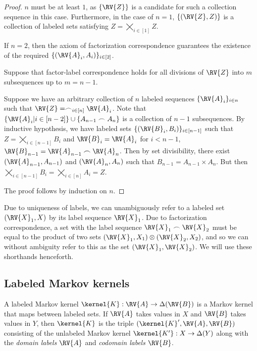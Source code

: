 \begin{proof}
$n$ must be at least $1$, as $\{\RV{Z}\}$ is a candidate for such a collection sequence in this case. Furthermore, in the case of $n=1$, $\{(\RV{Z},Z)\}$ is a collection of labeled sets satisfying $Z=\bigtimes_{i\in [1]} Z$.

If $n=2$, then the axiom of factorization correspondence guarantees the existence of the required $\{(\RV{A}_i,A_i)\}_{i\in [2]}$.

Suppose that factor-label correspondence holds for all divisions of $\RV{Z}$ into $m$ subsequences up to $m=n-1$.

Suppose we have an arbitrary collection of $n$ labeled sequences $\{\RV{A}_i\}_{i\in n}$ such that $\RV{Z}= \frown_{i\in [n]} \RV{A}_i$. Note that $\{\RV{A}_i|{i\in[n-2]}\}\cup\{A_{n-1}\frown A_n\}$ is a collection of $n-1$ subsequences. By inductive hypothesis, we have labeled sets $\{(\RV{B}_i,B_i)\}_{i\in [n-1]}$ such that $Z=\bigtimes_{i\in[n-1]} B_i$ and $\RV{B}_i=\RV{A}_i$ for $i<n-1$, $\RV{B}_{n-1} = \RV{A}_{n-1}\frown \RV{A}_{n}$. Then by set divisibility, there exist $(\RV{A}_{n-1},A_{n-1})$ and $(\RV{A}_n,A_n)$ such that $B_{n-1} = A_{n-1}\times A_n$. But then $\bigtimes_{i\in [n-1]} B_i=\bigtimes_{i\in [n]} A_i=Z$. 

The proof follows by induction on $n$.
\end{proof}

Due to uniqueness of labels, we can unambiguously refer to a labeled set $(\RV{X}_1,X)$ by its label sequence $\RV{X}_1$. Due to factorization correspondence, a set with the label sequence $\RV{X}_1\frown \RV{X}_2$ must be equal to the product of two sets $(\RV{X}_1,X_1)\otimes(\RV{X}_2,X_2)$, and so we can without ambiguity refer to this as the set $(\RV{X}_1, \RV{X}_2)$. We will use these shorthands henceforth.

\subsection{Labeled Markov kernels}\label{sec:labeled_kernels}


A labeled Markov kernel $\kernel{K}:\RV{A}\to \Delta(\RV{B})$ is a Markov kernel that maps between labeled sets. If $\RV{A}$ takes values in $X$ and $\RV{B}$ takes values in $Y$, then $\kernel{K}$ is the triple $(\kernel{K}',\RV{A},\RV{B})$ consisting of the unlabeled Markov kernel $\kernel{K'}:X\to \Delta(Y)$ along with the \emph{domain labels} $\RV{A}$ and \emph{codomain labels} $\RV{B}$.

